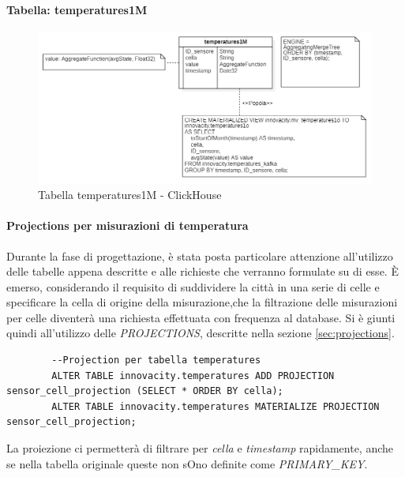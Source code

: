     \paragraph{Tabella: temperatures1M}
    \begin{figure}[H]
        \centering
        \includegraphics[width=1\textwidth]{../Images/SpecificaTecnica/temperatures1Mese.PNG}
        \caption{Tabella temperatures1M - ClickHouse}
        \label{fig:temperatures1M}
        \end{figure}
    
    \paragraph{Projections per misurazioni di temperatura} \label{sec:temp_projections}
    Durante la fase di progettazione, è stata posta particolare attenzione all'utilizzo delle tabelle appena descritte e alle richieste che verranno formulate su di esse. È emerso, considerando il requisito di suddividere la città in una serie di celle e specificare la cella di origine della misurazione,che la filtrazione delle misurazioni per celle diventerà una richiesta effettuata con frequenza al database.
    Si è giunti quindi all'utilizzo delle \textit{PROJECTIONS}, descritte nella sezione \ref{sec:projections}.

    \begin{lstlisting}
        --Projection per tabella temperatures
        ALTER TABLE innovacity.temperatures ADD PROJECTION sensor_cell_projection (SELECT * ORDER BY cella);
        ALTER TABLE innovacity.temperatures MATERIALIZE PROJECTION sensor_cell_projection;
    \end{lstlisting}

    La proiezione ci permetterà di filtrare per \textit{cella} e \textit{timestamp} rapidamente, anche se nella tabella originale queste non sOno definite come \textit{PRIMARY\_KEY}.

